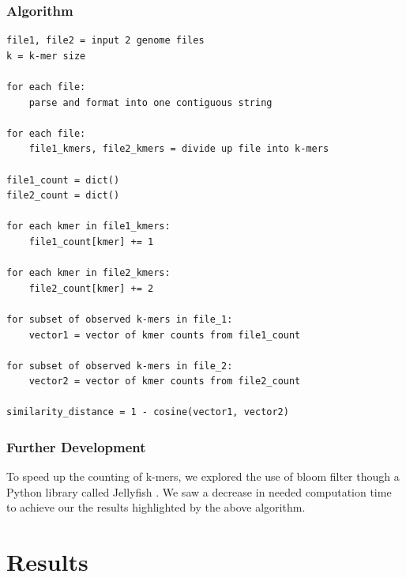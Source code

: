 \documentclass[12pt, letterpaper]{article}
\begin{document}
\subsubsection{Algorithm}
\begin{verbatim}
file1, file2 = input 2 genome files 
k = k-mer size

for each file:
    parse and format into one contiguous string

for each file:
    file1_kmers, file2_kmers = divide up file into k-mers

file1_count = dict()
file2_count = dict()

for each kmer in file1_kmers:
    file1_count[kmer] += 1

for each kmer in file2_kmers:
    file2_count[kmer] += 2

for subset of observed k-mers in file_1:
    vector1 = vector of kmer counts from file1_count

for subset of observed k-mers in file_2:
    vector2 = vector of kmer counts from file2_count

similarity_distance = 1 - cosine(vector1, vector2)
\end{verbatim}

\subsubsection{Further Development}
To speed up the counting of k-mers, we explored the use of bloom filter though a Python library called Jellyfish \cite{Jellyfish}. We saw a decrease in needed computation time to achieve our the results highlighted by the above algorithm.

\section{Results}
\end{document}
